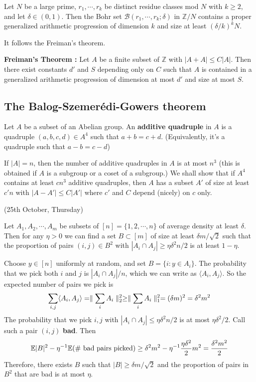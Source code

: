 \documentclass[10pt,a4paper]{report}
\newenvironment{proof}
{\begin{changemargin}{1cm}{0.5cm}
	}%
	{\end{changemargin}
}
\begin{document}
\prop Let $N$ be a large prime, $r_1, \cdots, r_k$ be distinct residue classes mod $N$ with $k\geq 2$, and let $\delta\in (0,1)$. Then the Bohr set $\mathscr{B}(r_1, \cdots, r_k ;\delta)$ in $\mathbb{Z}/N$ contains a proper generalized arithmetic progression of dimension $k$ and size at least $(\delta/k)^k N$.
\s

It follows the Freiman's theorem.
\s

\textbf{Freiman's Theorem :} Let $A$ be a finite subset of $\mathbb{Z}$ with $|A+A|\leq C|A|$. Then there exist constants $d'$ and $S$ depending only on $C$ such that $A$ is contained in a generalized arithmetic progression of dimension at most $d'$ and size at most $S$.
\s

\digression
\s

\subsection*{The Balog-Szemer\'{e}di-Gowers theorem}

 Let $A$ be a subset of an Abelian group. An \textbf{additive quadruple} in $A$ is a quadruple $(a,b,c,d) \in A^4$ such that $a+b = c+d$. (Equivalently, it's a quadruple such that $a-b= c-d$)
\s

If $|A|=n$, then the number of additive quadruples in $A$ is at most $n^3$ (this is obtained if $A$ is a subgroup or a coset of a subgroup.) We shall show that if $A^4$ contains at least $cn^3$ additive quadruples, then $A$ has a subset $A'$ of size at least $c'n$ with $|A-A'| \leq C|A'|$ where $c'$ and $C$ depend (nicely) on $c$ only.
\s

\newday

(25th October, Thursday)
\s

 Let $A_1, A_2,\cdots, A_m$ be subsets of $[n]=\{1,2,\cdots,n\}$ of average density at least $\delta$. Then for any $\eta >0$ we can find a set $B \subset [m]$ of size at least $\delta m/\sqrt{2}$ such that the proportion of pairs $(i,j) \in B^2$ with $|A_i \cap A_j| \geq \eta \delta^2 n/2$ is at least $1-\eta$.
\begin{proof}
\pf Choose $y\in [n]$ uniformly at random, and set $B = \{i: y\in A_i \}$. The probability that we pick both $i$ and $j$ is $|A_i \cap A_j|/n$, which we can write as $\langle A_i, A_j \rangle$. So the expected number of pairs we pick is 
\begin{align*}
\sum_{i,j} \langle A_i, A_j \rangle = \parallel \sum_i A_i \parallel_{2}^2 \geq \parallel \sum_i A_i \parallel_{1}^2 =(\delta m)^2 = \delta^2 m^2
\end{align*}
The probability that we pick $i,j$ with $|A_i \cap A_j| \leq \eta \delta^2 n/2$ is at most $\eta \delta^2 /2$. Call such a pair $(i,j)$ \textbf{bad}. Then
\begin{align*}
\mathbb{E} |B|^2 - \eta^{-1} \mathbb{E}(\# \text{ bad pairs picked}) \geq \delta^2 m^2 - \eta^{-1} \frac{\eta \delta^2}{2} m^2 = \frac{\delta^2 m^2}{2}
\end{align*}
Therefore, there exists $B$ such that $|B|\geq \delta m/\sqrt{2}$ and the proportion of pairs in $B^2$ that are bad is at most $\eta$.

\eop
\end{proof}
\s
\end{document}
